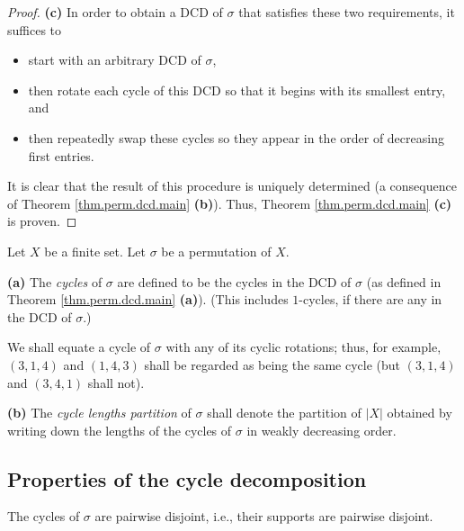 \begin{proof}
\medskip

\textbf{(c)} In order to obtain a DCD of $\sigma$ that satisfies these two
requirements, it suffices to

\begin{itemize}
\item start with an arbitrary DCD of $\sigma$,

\item then rotate each cycle of this DCD so that it begins with its smallest
entry, and

\item then repeatedly swap these cycles so they appear in the order of
decreasing first entries.
\end{itemize}

It is clear that the result of this procedure is uniquely determined (a
consequence of Theorem \ref{thm.perm.dcd.main} \textbf{(b)}). Thus, Theorem
\ref{thm.perm.dcd.main} \textbf{(c)} is proven.
\end{proof}

\begin{definition}
\label{def.perm.cycs.cycs}
\leantarget
\leanok
Let $X$ be a finite set. Let $\sigma$ be a
permutation of $X$. \medskip

\textbf{(a)} The \emph{cycles} of $\sigma$ are defined to be the cycles in the
DCD of $\sigma$ (as defined in Theorem \ref{thm.perm.dcd.main} \textbf{(a)}).
(This includes $1$-cycles, if there are any in the DCD of $\sigma$.)

We shall equate a cycle of $\sigma$ with any of its cyclic rotations; thus,
for example, $\left(  3,1,4\right)  $ and $\left(  1,4,3\right)  $ shall be
regarded as being the same cycle (but $\left(  3,1,4\right)  $ and $\left(
3,4,1\right)  $ shall not). \medskip

\textbf{(b)} The \emph{cycle lengths partition} of $\sigma$ shall denote the
partition of $\left\vert X\right\vert $ obtained by writing down the lengths
of the cycles of $\sigma$ in weakly decreasing order.
\end{definition}

\subsection{Properties of the cycle decomposition}

\begin{lemma}
\label{lem.cycles_pairwise_disjoint}
\leanhelper
\leanok
The cycles of $\sigma$ are pairwise disjoint, i.e., their supports are pairwise disjoint.
\end{lemma}

